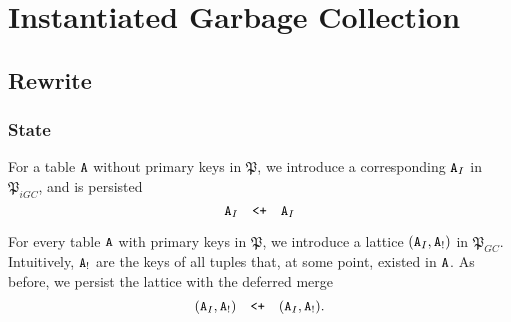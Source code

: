 \documentclass{article}
\numberwithin{equation}{section}
\renewcommand{\tt}[1]{\ifmmode\text{\texttt{#1}}\else\texttt{#1}\fi}
\begin{document}






\section{Instantiated Garbage Collection}

\subsection{Rewrite}

\subsubsection{State}
For a table $\tt{A}$ without primary keys in $\mathfrak{P}$, we introduce a corresponding $\tt{A}_I$ in $\mathfrak{P}_{iGC}$, and is persisted
\[\tt{A}_I \quad\tt{<+}\quad \tt{A}_I\]

For every table $\tt{A}$ with primary keys in $\mathfrak{P}$, we introduce a lattice $(\tt{A}_I, \tt{A}_!)$ in $\mathfrak{P}_{GC}$.
Intuitively, $\tt{A}_!$ are the keys of all tuples that, at some point, existed in $\tt{A}$.
As before, we persist the lattice with the deferred merge
\[(\tt{A}_I, \tt{A}_!) \quad\tt{<+}\quad (\tt{A}_I, \tt{A}_!).\]
\end{document}
